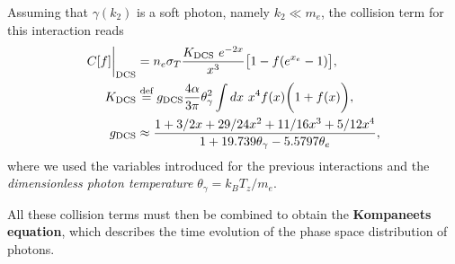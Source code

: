 \begin{enumerate}
\begin{multicols}{2}
    \end{multicols}
    Assuming that $\gamma(k_2)$ is a soft photon, namely $k_2\ll m_e$, the collision term for this interaction reads
    \begin{align}\label{eq:C_DCS}
        C[f]\bigg|_{\text{DCS}}&=n_e\sigma_T\frac{K_{\text{DCS}}\ e^{-2x}}{x^3}\big[1-f(e^{x_e}-1)\big],\\
        K_{\text{DCS}}&\defeq g_{\text{DCS}}\frac{4\alpha}{3\pi}\theta_\gamma^2\int dx\ x^4f(x)\bigg(1+f(x)\bigg),\nonumber\\\nonumber
        g_{\text{DCS}}&\approx\frac{1+3/2x+29/24x^2+11/16x^3+5/12x^4}{1+19.739\theta_\gamma-5.5797\theta_e},
    \end{align} 
    where we used the variables introduced for the previous interactions and the \emph{dimensionless photon temperature} $\theta_\gamma=k_BT_z/m_e$.
\end{enumerate} 
All these collision terms must then be combined to obtain the \textbf{Kompaneets equation}, which describes the time evolution of the phase space distribution of photons.

